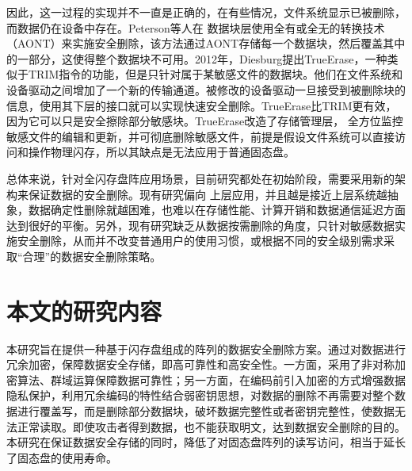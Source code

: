 因此，这一过程的实现并不一直是正确的，在有些情况，文件系统显示已被删除，而数据仍在设备中存在。Peterson等人\cite{Peterson2005Secure}在
数据块层使用全有或全无的转换技术（AONT）来实施安全删除，该方法通过AONT存储每一个数据块，然后覆盖其中的一部分，这使得整个数据块不可用。2012年，Diesburg提出TrueErase\cite{Diesburg2012TrueErase}，一种类似于TRIM指令的功能，但是只针对属于某敏感文件的数据块。他们在文件系统和设备驱动之间增加了一个新的传输通道。被修改的设备驱动一旦接受到被删除块的信息，使用其下层的接口就可以实现快速安全删除。TrueErase比TRIM更有效，因为它可以只是安全擦除部分敏感块。TrueErase改造了存储管理层，
全方位监控敏感文件的编辑和更新，并可彻底删除敏感文件，前提是假设文件系统可以直接访问和操作物理闪存，所以其缺点是无法应用于普通固态盘。


总体来说，针对全闪存盘阵应用场景，目前研究都处在初始阶段，需要采用新的架构来保证数据的安全删除\cite{傅颖勋2013安全云存储系统与关键技术综述}。现有研究偏向
上层应用，并且越是接近上层系统越抽象，数据确定性删除就越困难\cite{Reardon2013SoK}，也难以在存储性能、计算开销和数据通信延迟方面达到很好的平衡\cite{李晖2014公共云存储服务数据安全及隐私保护技术综述}。另外，现有研究缺乏从数据按需删除的角度，只针对敏感数据实施安全删除，从而并不改变普通用户的使用习惯，或根据不同的安全级别需求采取“合理”的数据安全删除策略。
\section{本文的研究内容}
本研究旨在提供一种基于闪存盘组成的阵列的数据安全删除方案。通过对数据进行冗余加密，保障数据安全存储，即高可靠性和高安全性。一方面，采用了非对称加密算法、群域运算保障数据可靠性；另一方面，在编码前引入加密的方式增强数据隐私保护，利用冗余编码的特性结合弱密钥思想，对数据的删除不再需要对整个数据进行覆盖写，而是删除部分数据块，破坏数据完整性或者密钥完整性，使数据无法正常读取。即使攻击者得到数据，也不能获取明文，达到数据安全删除的目的。本研究在保证数据安全存储的同时，降低了对固态盘阵列的读写访问，相当于延长了固态盘的使用寿命。

